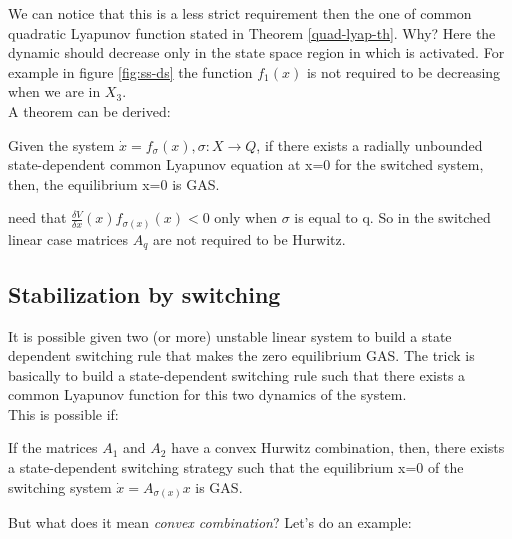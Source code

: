  We can notice that this is a less strict requirement then the one of common quadratic Lyapunov function stated in Theorem \ref{quad-lyap-th}. Why? Here the dynamic should decrease only in the state space region in which is activated. For example in figure \ref{fig:ss-ds} the function $f_1(x)$ is not required to be decreasing when we are in $X_3$.\\
 A theorem can be derived:
\begin{thm}
	Given the system $\dot{x}=f_{\sigma}(x), \sigma\colon X\to Q$, if there exists a radially unbounded state-dependent common Lyapunov equation at x=0 for the switched system, then, the equilibrium x=0 is GAS.
\end{thm}
\begin{remark}
	need that $\frac{\delta V}{\delta x}(x)f_{\sigma(x)}(x)<0$ only when $\sigma$ is equal to q. So in the switched linear case matrices $A_q$ are not required to be Hurwitz.
\end{remark}
\subsection{Stabilization by switching}
It is possible given two (or more) unstable linear system to build a state dependent switching rule that makes the zero equilibrium GAS. The trick is basically to build a state-dependent switching rule such that there exists a common Lyapunov function for this two dynamics of the system.\\ This is possible if:
\begin{thm}
	If the matrices $A_1$ and $A_2$ have a convex Hurwitz combination, then, there exists a state-dependent switching strategy such that the equilibrium x=0 of the switching system $\dot{x}=A_{\sigma(x)}x$ is GAS.
\end{thm}

But what does it mean \emph{convex combination}? Let's do an example:
